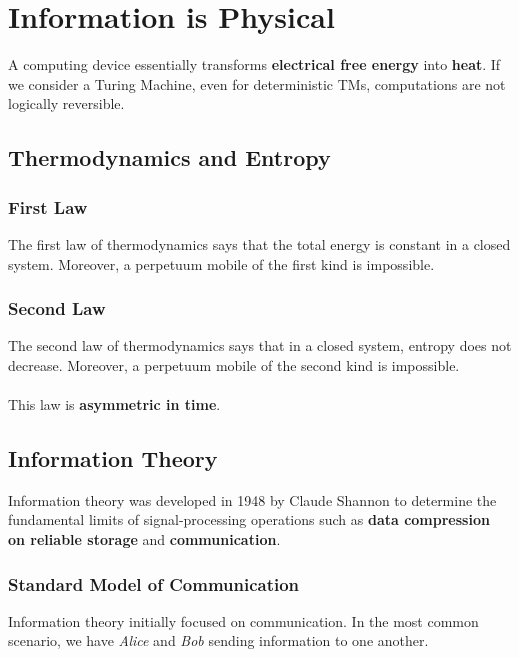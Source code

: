 \documentclass{article}
\begin{document}
\section{Information is Physical}
A computing device essentially transforms \textbf{electrical free energy} into \textbf{heat}. If we consider a Turing Machine, even for deterministic TMs, computations are not logically reversible.

\subsection{Thermodynamics and Entropy}
\subsubsection{First Law}
The first law of thermodynamics says that the total energy is constant in a closed system. Moreover, a perpetuum mobile of the first kind is impossible.

\subsubsection{Second Law}
The second law of thermodynamics says that in a closed system, entropy does not decrease. Moreover, a perpetuum mobile of the second kind is impossible. \\ \\
This law is \textbf{asymmetric in time}.

\subsection{Information Theory}
Information theory was developed in 1948 by Claude Shannon to determine the fundamental limits of signal-processing operations such as \textbf{data compression on reliable storage} and \textbf{communication}.

\subsubsection{Standard Model of Communication}
Information theory initially focused on communication. In the most common scenario, we have \textit{Alice} and \textit{Bob} sending information to one another.
\end{document}
